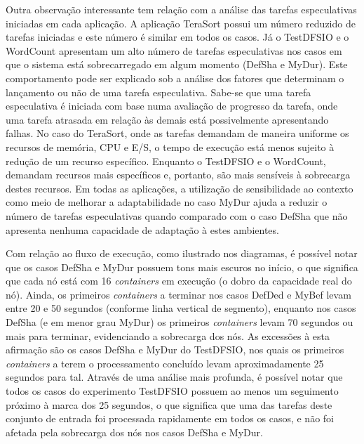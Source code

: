 Outra observação interessante tem relação com a análise das tarefas especulativas iniciadas em cada aplicação. A aplicação TeraSort possui um número reduzido de tarefas iniciadas e este número é similar em todos os casos. Já o TestDFSIO e o WordCount apresentam um alto número de tarefas especulativas nos casos em que o sistema está sobrecarregado em algum momento (DefSha e MyDur). Este comportamento pode ser explicado sob a análise dos fatores que determinam o lançamento ou não de uma tarefa especulativa. Sabe-se que uma tarefa especulativa é iniciada com base numa avaliação de progresso da tarefa, onde uma tarefa atrasada em relação às demais está possivelmente apresentando falhas. No caso do TeraSort, onde as tarefas demandam de maneira uniforme os recursos de memória, CPU e E/S, o tempo de execução está menos sujeito à redução de um recurso específico. Enquanto o TestDFSIO e o WordCount, demandam recursos mais específicos e, portanto, são mais sensíveis à sobrecarga destes recursos. Em todas as aplicações, a utilização de sensibilidade ao contexto como meio de melhorar a adaptabilidade no caso MyDur ajuda a reduzir o número de tarefas especulativas quando comparado com o caso DefSha que não apresenta nenhuma capacidade de adaptação à estes ambientes.

Com relação ao fluxo de execução, como ilustrado nos diagramas, é possível notar que os casos DefSha e MyDur possuem tons mais escuros no início, o que significa que cada nó está com 16 \textit{containers} em execução (o dobro da capacidade real do nó). Ainda, os primeiros \textit{containers} a terminar nos casos DefDed e MyBef levam entre 20 e 50 segundos (conforme linha vertical de segmento), enquanto nos casos DefSha (e em menor grau MyDur) os primeiros \textit{containers} levam 70 segundos ou mais para terminar, evidenciando a sobrecarga dos nós. As excessões à esta afirmação são os casos DefSha e MyDur do TestDFSIO, nos quais os primeiros \textit{containers} a terem o processamento concluído levam aproximadamente 25 segundos para tal. Através de uma análise mais profunda, é possível notar que todos os casos do experimento TestDFSIO possuem ao menos um seguimento próximo à marca dos 25 segundos, o que significa que uma das tarefas deste conjunto de entrada foi processada rapidamente em todos os casos, e não foi afetada pela sobrecarga dos nós nos casos DefSha e MyDur.

